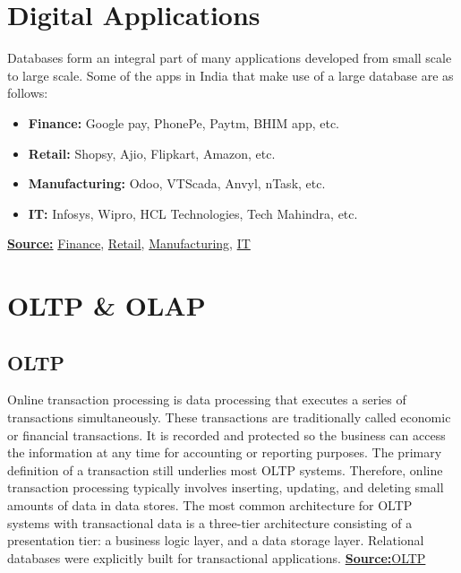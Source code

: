 \documentclass{article}
\newcounter{source}
\begin{document}
\section{Digital Applications}
Databases form an integral part of many applications developed from small scale
to large scale. Some of the apps in India that make use of a large
database are as follows:
\begin{itemize}
    \item \textbf{Finance:} Google pay, PhonePe, Paytm, BHIM app, etc.
    \item \textbf{Retail:} Shopsy, Ajio, Flipkart, Amazon, etc.
    \item \textbf{Manufacturing:} Odoo, VTScada, Anvyl, nTask, etc.
    \item \textbf{IT:} Infosys, Wipro, HCL Technologies, Tech Mahindra, etc.
\end{itemize}
\textbf{\underline{Source:}}\hspace{\parindent}
\href{https://www.similarweb.com/apps/top/google/app-index/in/finance/top-free/}{Finance},
\href{https://www.mobileaction.co/top-apps/shopping-18/android/in}{Retail},
\href{https://sourceforge.net/software/manufacturing/india/}{Manufacturing},
\href{https://en.wikipedia.org/wiki/List_of_Indian_IT_companies}{IT}
\section{OLTP \& OLAP}
\subsection{OLTP}
Online transaction processing is data processing that executes a series of transactions simultaneously. 
These transactions are traditionally called economic or financial transactions. It is recorded and protected so the business can access the information 
at any time for accounting or reporting purposes. The primary definition of a transaction still underlies most OLTP systems. Therefore, 
online transaction processing typically involves inserting, updating, and deleting small amounts of data in data stores. 
The most common architecture for OLTP systems with transactional data is a three-tier architecture consisting of a presentation tier: 
a business logic layer, and a data storage layer. Relational databases were explicitly built for transactional applications.\newline \newline
\textbf{\underline{Source:}}\hspace{\parindent}\href{https://www.oracle.com/in/database/what-is-oltp/#:~:text=OLTP%20or%20Online%20Transaction%20Processing,sending%20text%20messages%2C%20for%20example.}{OLTP}
\end{document}
